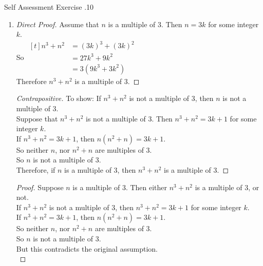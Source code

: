 \documentclass[../notes.tex]{subfiles}
\begin{document}
\begin{exercise}{Self Assessment Exercise \thechapter.10}
\begin{enumerate}
\begin{enumerate}[label=(\alph*)]
\begin{proof}[Contradiction]
										So $x$ is odd.\\
										But this contradicts the original assumption, so it must be the case that $x^{2} + 4x + 2$ is even.
									\end{proof}
								\item {}
									\begin{proof}[Direct Proof]
										Assume that $n$ is a multiple of $3$. Then $n = 3k$ for some integer $k$.\\
										So $\begin{aligned}[t]
											n^{3} + n^{2} &= (3k)^{3} + (3k)^{2}\\
											&= 27k^{3} + 9k^{2}\\
											&= 3(9k^{3} + 3k^{2})
										\end{aligned} $\\
										Therefore $n^{3} + n^{2}$ is a multiple of $3$.
									\end{proof}
									\begin{proof}[Contrapositive]
										To show: If $n^{3} + n^{2}$ is not a multiple of $3$, then $n$ is not a multiple of $3$.\\
										Suppose that $n^{3} + n^{2}$ is not a multiple of $3$. Then $n^{3} + n^{2} = 3k + 1$ for some integer $k$.\\
										If $n^{3} + n^{2} = 3k + 1$, then $n(n^{2} + n) = 3k + 1$.\\
										So neither $n$, nor $n^{2} + n$ are multiples of $3$.\\
										So $n$ is not a multiple of $3$.\\
										Therefore, if $n$ is a multiple of $3$, then $n^{3} + n^{2}$ is a multiple of $3$.
									\end{proof}
									\begin{proof}
										Suppose $n$ is a multiple of $3$. Then either $n^{3} + n^{2}$ is a multiple of $3$, or not.\\
										If $n^{3} + n^{2}$ is not a multiple of $3$, then $n^{3} + n^{2} = 3k + 1$ for some integer $k$.\\
										If $n^{3} + n^{2} = 3k + 1$, then $n(n^{2} + n) = 3k + 1$.\\
										So neither $n$, nor $n^{2} + n$ are multiples of $3$.\\
										So $n$ is not a multiple of $3$.\\
										But this contradicts the original assumption.\\

\end{proof}
\end{enumerate}
\end{enumerate}
\end{exercise}
\end{document}
